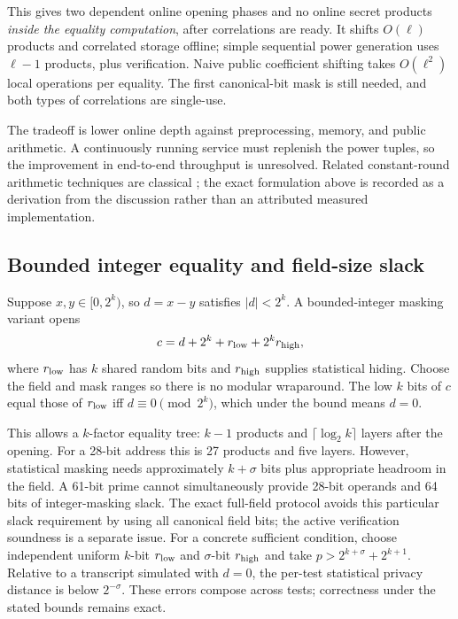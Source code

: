 \documentclass[11pt]{article}
\begin{document}
This gives two dependent online opening phases and no online secret products
\emph{inside the equality computation}, after correlations are ready. It shifts
$O(\ell)$ products and correlated storage offline; simple sequential power
generation uses $\ell-1$ products, plus verification. Naive public coefficient
shifting takes $O(\ell^2)$ local operations per equality. The first canonical-bit
mask is still needed, and both types of correlations are single-use.

The tradeoff is lower online depth against preprocessing, memory, and public
arithmetic. A continuously running service must replenish the power tuples, so
the improvement in end-to-end throughput is unresolved. Related constant-round
arithmetic techniques are classical \cite{damgard2006}; the exact formulation
above is recorded as a derivation from the discussion rather than an attributed
measured implementation.

\subsection{Bounded integer equality and field-size slack}

Suppose $x,y\in[0,2^k)$, so $d=x-y$ satisfies $|d|<2^k$. A bounded-integer
masking variant opens
\begin{equation}
c=d+2^k+r_{\rm low}+2^kr_{\rm high},
\label{eq:bounded-eq}
\end{equation}
where $r_{\rm low}$ has $k$ shared random bits and $r_{\rm high}$ supplies
statistical hiding. Choose the field and mask ranges so there is no modular
wraparound. The low $k$ bits of $c$ equal those of $r_{\rm low}$ iff
$d\equiv0\pmod{2^k}$, which under the bound means $d=0$.

This allows a $k$-factor equality tree: $k-1$ products and
$\lceil\log_2k\rceil$ layers after the opening. For a 28-bit address this is
27 products and five layers. However, statistical masking needs approximately
$k+\sigma$ bits plus appropriate headroom in the field. A 61-bit prime cannot
simultaneously provide 28-bit operands and 64 bits of integer-masking slack.
The exact full-field protocol avoids this particular slack requirement by using
all canonical field bits; the active verification soundness is a separate issue.
For a concrete sufficient condition, choose independent uniform $k$-bit
$r_{\rm low}$ and $\sigma$-bit $r_{\rm high}$ and take
$p>2^{k+\sigma}+2^{k+1}$. Relative to a transcript simulated with $d=0$, the
per-test statistical privacy distance is below $2^{-\sigma}$. These errors
compose across tests; correctness under the stated bounds remains exact.
\end{document}
